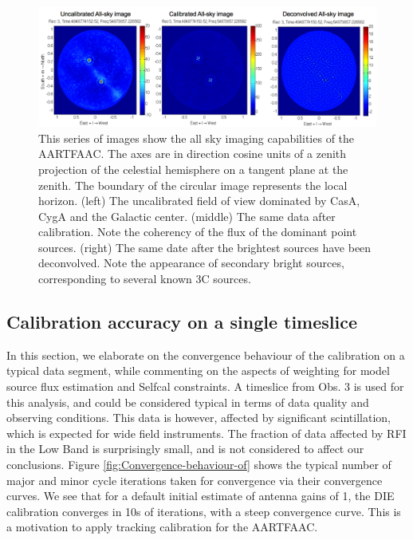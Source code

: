 \documentclass{aa}
\begin{document}
\begin{figure}[tbh]
\includegraphics[width=0.9\paperwidth]{Figs/uncal_cal_deconv_night}

\caption{\label{fig:uncal_cal_deconv_night} This  series of images  show the all
  sky imaging  capabilities of  the AARTFAAC. The  axes are in  direction cosine
  units of a zenith projection of the celestial hemisphere on a tangent plane at
  the  zenith.  The  boundary  of   the  circular  image  represents  the  local
  horizon. (left) The uncalibrated field of view dominated by CasA, CygA and the
  Galactic center. (middle) The same  data after calibration. Note the coherency
  of the  flux of the  dominant point sources.  (right) The same date  after the
  brightest  sources have  been deconvolved.  Note the  appearance  of secondary
  bright sources, corresponding to several known 3C sources.}
\end{figure}


\subsection{Calibration accuracy on a single timeslice}

In this section, we elaborate on the convergence behaviour of the calibration on
a typical data  segment, while commenting on the aspects  of weighting for model
source flux estimation  and Selfcal constraints.  A timeslice  from Obs. 3 is
used for this analysis, and could be considered typical in terms of data quality
and  observing  conditions.   This  data  is however,  affected  by  significant
scintillation, which  is expected  for wide field  instruments. The  fraction of
data    affected    by    RFI     in    the    Low    Band    is    surprisingly
small\citep{offringa2012lofar},   and   is   not   considered  to   affect   our
conclusions. Figure \ref{fig:Convergence-behaviour-of}  shows the typical number
of major and minor cycle  iterations taken for convergence via their convergence
curves. We see  that for a default  initial estimate of antenna gains  of 1, the
DIE  calibration  converges in  10s  of  iterations,  with a  steep  convergence
curve. This is a motivation to apply tracking calibration for the AARTFAAC.
\end{document}

